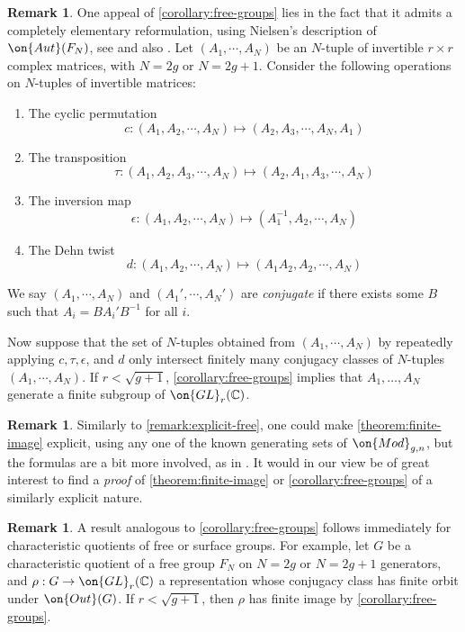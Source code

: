 \documentclass[12 pt]{amsart}
\theoremstyle{plain}
\theoremstyle{definition}
\newtheorem{remark}[subsubsection]{Remark}
\theoremstyle{remark}
\numberwithin{equation}{section}
\begin{document}
\begin{remark}
	\label{remark:explicit-free}
One appeal of \autoref{corollary:free-groups} lies in the fact that it admits a completely elementary reformulation, using Nielsen's description of $\on{Aut}(F_N)$,
see \cite{nielsen:die-isomorphismengruppe} 
and also \cite[Theorem 3.2, p. 131]{magnusKS:combinatorial-group-theory}.
Let $(A_1, \cdots, A_N)$ be an $N$-tuple of invertible $r\times r$ complex matrices, with $N=2g$ or $N=2g+1$. Consider the following operations on $N$-tuples of invertible matrices:
\begin{enumerate}
	\item The cyclic permutation $$c: (A_1, A_2, \cdots, A_N)\mapsto (A_2, A_3, \cdots, A_N, A_1)$$
	\item The transposition $$\tau: (A_1, A_2, A_3, \cdots, A_N)\mapsto (A_2, A_1, A_3, \cdots, A_N)$$
	\item The inversion map  $$\epsilon: (A_1, A_2, \cdots, A_N)\mapsto (A_1^{-1},A_2, \cdots, A_N)$$
	\item The Dehn twist $$d: (A_1, A_2, \cdots, A_N)\mapsto (A_1A_2, A_2, \cdots, A_N)$$
\end{enumerate}
	We say $(A_1, \cdots, A_N)$ and $(A_1', \cdots, A_N')$ are \emph{conjugate} if there exists some $B$ such that $A_i=BA_i'B^{-1}$ for all $i$. 
	
	Now suppose that the set of $N$-tuples obtained from $(A_1, \cdots, A_N)$ by repeatedly applying $c, \tau, \epsilon$, and $d$ only intersect finitely many conjugacy classes of $N$-tuples
	$(A_1, \cdots, A_N)$. 
	If $r<\sqrt{g+1}$,
	\autoref{corollary:free-groups} implies that $A_1, \ldots, A_N$ generate a finite subgroup of $\on{GL}_r(\mathbb{C})$. 
\end{remark}
\begin{remark}
	\label{remark:}
	Similarly to \autoref{remark:explicit-free}, one could make
	\autoref{theorem:finite-image} explicit, using any one of the known
	generating sets of $\on{Mod}_{g,n}$, but the formulas are a bit more
	involved, as in \cite[\S6]{CH:isomonodromic}. It would in our view be of great interest to find a \emph{proof} of \autoref{theorem:finite-image} or \autoref{corollary:free-groups} of a similarly explicit nature.
\end{remark}
	
\begin{remark}
A result analogous to \autoref{corollary:free-groups} follows immediately for
characteristic quotients of free or surface groups. For example, let $G$ be a
characteristic quotient of a free group $F_N$ on $N=2g$ or $N=2g+1$ generators,
and $\rho: G\to \on{GL}_r(\mathbb{C})$ a representation whose conjugacy class has finite orbit under $\on{Out}(G)$. If $r<\sqrt{g+1}$, then $\rho$ has finite image by \autoref{corollary:free-groups}.
\end{remark}
\end{document}
